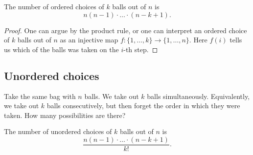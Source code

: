 \begin{page}
\setcounter{section}{2}
\setcounter{subsection}{3}
\setcounter{dfn}{10}
\label{portion:61}

\begin{thm}
The number of ordered choices of $k$ balls out of $n$ is
\[
n(n-1)\cdot \ldots \cdot (n-k+1).
\]
\end{thm}

\end{page}

\begin{page}
\setcounter{section}{2}
\setcounter{subsection}{4}
\setcounter{dfn}{10}
\label{portion:62}

\begin{proof}
One can argue by the product rule, or one can interpret an ordered choice of $k$ balls out of $n$ as an injective map $f \colon \{1, \ldots, k\} \to \{1, \ldots, n\}$.
Here $f(i)$ tells us which of the balls was taken on the $i$-th step.
\end{proof}




\end{page}

\begin{page}
\setcounter{section}{2}
\setcounter{subsection}{4}
\setcounter{dfn}{10}
\label{portion:64}

\subsection{Unordered choices}
Take the same bag with $n$ balls.
We take out $k$ balls simultaneously.
Equivalently, we take out $k$ balls consecutively, but then forget the order in which they were taken.
How many possibilities are there?


\end{page}

\begin{page}
\setcounter{section}{2}
\setcounter{subsection}{4}
\setcounter{dfn}{11}
\label{portion:66}

\begin{thm}
\label{thm:Comb}
The number of unordered choices of $k$ balls out of $n$ is
\[
\frac{n(n-1)\cdot \ldots \cdot (n-k+1)}{k!}.
\]
\end{thm}

\end{page}

